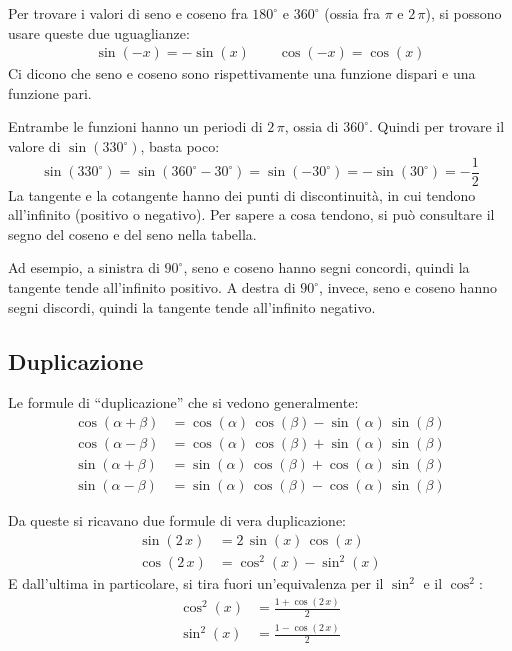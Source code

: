Per trovare i valori di seno e coseno fra $180^{\circ}$ e $360^{\circ}$ 
(ossia fra $\pi$ e $2 \, \pi$), si possono usare queste due uguaglianze:
\begin{align*}
\sin(-x) = - \sin(x) \qquad \cos(-x) = \cos(x)
\end{align*}
Ci dicono che seno e coseno sono rispettivamente una funzione dispari 
e una funzione pari.

Entrambe le funzioni hanno un periodi di $2 \, \pi$, ossia di $360^{\circ}$.
Quindi per trovare il valore di $\sin(330^{\circ})$, basta poco:
\[
\sin(330^{\circ}) = \sin(360^{\circ} - 30^{\circ}) =
\sin(-30^{\circ}) = - \sin(30^{\circ}) = - \frac{1}{2}
\]
La tangente e la cotangente hanno dei punti di discontinuit\`a, in cui 
tendono all'infinito (positivo o negativo). Per sapere a cosa tendono, si
pu\`o consultare il segno del coseno e del seno nella tabella.

Ad esempio, a sinistra di $90^{\circ}$, seno e coseno hanno segni concordi,
quindi la tangente tende all'infinito positivo. A destra di $90^{\circ}$, 
invece, seno e coseno hanno segni discordi, quindi la tangente tende
all'infinito negativo.

\subsection{Duplicazione}

Le formule di ``duplicazione'' che si vedono generalmente:
\begin{align*}
\cos(\alpha + \beta) &= \cos(\alpha) \, \cos(\beta) - \sin(\alpha) \, \sin(\beta) \\
\cos(\alpha - \beta) &= \cos(\alpha) \, \cos(\beta) + \sin(\alpha) \, \sin(\beta) \\
\sin(\alpha + \beta) &= \sin(\alpha) \, \cos(\beta) + \cos(\alpha) \, \sin(\beta)\\
\sin(\alpha - \beta) &= \sin(\alpha) \, \cos(\beta) - \cos(\alpha) \, \sin(\beta)
\end{align*}

Da queste si ricavano due formule di vera duplicazione:
\begin{align*}
\sin( 2 \, x) &= 2 \, \sin (x) \, \cos (x) \\
\cos (2 \, x) &= \cos^2 (x) - \sin^2 (x)
\end{align*}
E dall'ultima in particolare, si tira fuori un'equivalenza per il $\sin^2$ e il $\cos^2$:
\begin{align*}
\cos^2 (x) &= \frac{1 + \cos (2 \, x)}{2} \\
\sin^2 (x) &= \frac{1 - \cos (2 \, x)}{2}
\end{align*}

